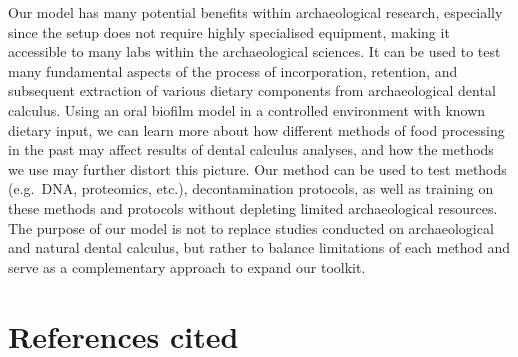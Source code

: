 \documentclass[
  b5paper,
]{book}
\begin{document}
Our model has many potential benefits within archaeological research,
especially since the setup does not require highly specialised
equipment, making it accessible to many labs within the archaeological
sciences. It can be used to test many fundamental aspects of the process
of incorporation, retention, and subsequent extraction of various
dietary components from archaeological dental calculus. Using an oral
biofilm model in a controlled environment with known dietary input, we
can learn more about how different methods of food processing in the
past may affect results of dental calculus analyses, and how the methods
we use may further distort this picture. Our method can be used to test
methods (e.g.~DNA, proteomics, etc.), decontamination protocols, as well
as training on these methods and protocols without depleting limited
archaeological resources. The purpose of our model is not to replace
studies conducted on archaeological and natural dental calculus, but
rather to balance limitations of each method and serve as a
complementary approach to expand our toolkit.

\section{References cited}\label{references-cited-2}
\end{document}
